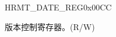 \begin{register}{H}{RMT\_DATE\_REG}{0x00CC}\label{regdesc:RMTDATEREG}
%
%
\regnewline%
\begin{regdesc}\begin{reglist}
\label{fielddesc:RMTDATE}\item [RMT\_DATE] 版本控制寄存器。(R/W)
\end{reglist}\end{regdesc}
\end{register}
